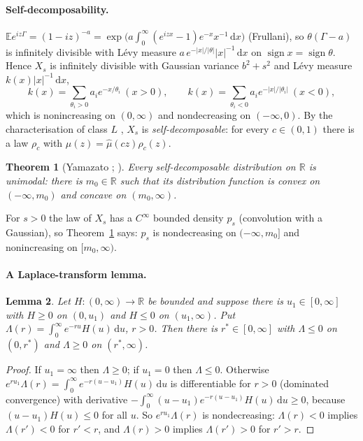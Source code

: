 \documentclass[11pt]{article}
\newtheorem{theorem}{Theorem}[section]
\newtheorem{lemma}[theorem]{Lemma}
\theoremstyle{remark}
\newcommand{\E}{\mathbb{E}}
\newcommand{\R}{\mathbb{R}}
\newcommand{\sgn}{\operatorname{sign}}
\newcommand{\dd}{\,\mathrm{d}}
\begin{document}
\paragraph{Self-decomposability.} $\E e^{iz\Gamma}=(1-iz)^{-a}=\exp\!\big(a\int_0^\infty(e^{izx}-1)e^{-x}x^{-1}\dd x\big)$ (Frullani), so
$\theta(\Gamma-a)$ is infinitely divisible with L\'evy measure $a\,e^{-|x|/|\theta|}|x|^{-1}\dd x$ on $\sgn x=\sgn\theta$. Hence $X_s$ is
infinitely divisible with Gaussian variance $b^2+s^2$ and L\'evy measure $k(x)|x|^{-1}\dd x$,
\[
k(x)=\sum_{\theta_i>0}a_ie^{-x/\theta_i}\ (x>0),\qquad k(x)=\sum_{\theta_i<0}a_ie^{-|x|/|\theta_i|}\ (x<0),
\]
which is nonincreasing on $(0,\infty)$ and nondecreasing on $(-\infty,0)$. By the characterisation of class $L$
\cite[Cor.~15.11]{Sato}, $X_s$ is \emph{self-decomposable}: for every $c\in(0,1)$ there is a law $\rho_c$ with $\hat\mu(z)=\hat\mu(cz)\hat\rho_c(z)$.

\begin{theorem}[Yamazato \cite{Yamazato}; {\cite[Thm.~53.1]{Sato}}]\label{thm:yamazato}
Every self-decomposable distribution on $\R$ is unimodal: there is $m_0\in\R$ such that its distribution function is convex on
$(-\infty,m_0)$ and concave on $(m_0,\infty)$.
\end{theorem}
For $s>0$ the law of $X_s$ has a $C^\infty$ bounded density $p_s$ (convolution with a Gaussian), so Theorem~\ref{thm:yamazato} says:
$p_s$ is nondecreasing on $(-\infty,m_0]$ and nonincreasing on $[m_0,\infty)$.

\paragraph{A Laplace-transform lemma.}
\begin{lemma}\label{lem:laplace}
Let $H:(0,\infty)\to\R$ be bounded and suppose there is $u_1\in[0,\infty]$ with $H\ge0$ on $(0,u_1)$ and $H\le0$ on $(u_1,\infty)$.
Put $\Lambda(r)=\int_0^\infty e^{-ru}H(u)\dd u$, $r>0$. Then there is $r^*\in[0,\infty]$ with $\Lambda\le0$ on $(0,r^*)$ and
$\Lambda\ge0$ on $(r^*,\infty)$.
\end{lemma}
\begin{proof}
If $u_1=\infty$ then $\Lambda\ge0$; if $u_1=0$ then $\Lambda\le0$. Otherwise $e^{ru_1}\Lambda(r)=\int_0^\infty e^{-r(u-u_1)}H(u)\dd u$ is
differentiable for $r>0$ (dominated convergence) with derivative $-\int_0^\infty(u-u_1)e^{-r(u-u_1)}H(u)\dd u\ge0$, because
$(u-u_1)H(u)\le0$ for all $u$. So $e^{ru_1}\Lambda(r)$ is nondecreasing: $\Lambda(r)<0$ implies $\Lambda(r')<0$ for $r'<r$, and
$\Lambda(r)>0$ implies $\Lambda(r')>0$ for $r'>r$.
\end{proof}
\end{document}
